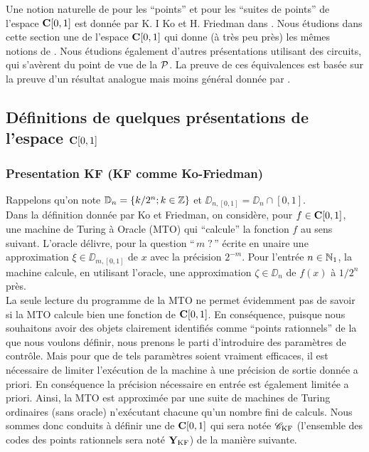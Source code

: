 Une notion naturelle de \com pour les ``points'' et pour les ``suites de points'' 
de l'espace   ${{\bf C}[0,1]}$  est donnée par  K. I Ko et H. Friedman dans \cite{fKF82}. 
Nous étudions dans cette section une \rp  de l'espace  ${{\bf C}[0,1]}$  qui donne (à très peu près) les mêmes notions de \com. Nous étudions également 
d'autres présentations utilisant des circuits, qui s'avèrent \equivas du 
point de vue de la \com  ${\cal P}$. La preuve de ces équivalences est basée sur 
la preuve d'un résultat analogue mais moins général donnée par 
\cite{fHo87,fHo90}. 

\subsection {Définitions de quelques présentations de l'espace 
 \texorpdfstring{${{\bf C}[0,1]}$}{C[0,1]}}\label{fsubsec41}
 
\subsubsection{Presentation KF (KF comme Ko-Friedman) }\label{fsubsubsec411}
Rappelons qu'on note  $\mathbb {D}_n = \{ k/2^n ; k \in \mathbb {Z} \}$  et  $\DD_{n,[0,1]} = 
\DD_n \cap [0,1]$.   \\ 
Dans la définition donnée par Ko et Friedman, on considère, pour  
$f \in {{\bf C}[0,1]}$, une machine de Turing à Oracle  (MTO)  qui ``calcule'' la 
fonction $f$ au sens suivant. 
 L'oracle délivre, pour la question  ``$\,m\;?\,$'' écrite en unaire  une approximation 
  $\xi \in\DD_{m,[0,1]}$ de $x$ avec la précision  $2^{-m}$. 
Pour l'entrée  $n \in  \mathbb {N}_1$, la machine calcule, en utilisant l'oracle, une 
approximation $ \zeta  \in  \DD_n$  de  $f(x)$  à $1/2^n$  près.\\
La seule lecture du programme de la  MTO  ne permet évidemment pas de savoir si la  MTO  calcule bien une fonction de  ${{\bf C}[0,1]}$.  En conséquence, puisque nous souhaitons avoir des objets clairement identifiés comme ``points rationnels'' de la \pres que nous voulons définir, nous prenons le parti d'introduire des paramètres de contrôle. 
Mais pour que de tels paramètres soient vraiment efficaces, il est nécessaire de limiter l'exécution de la machine à une précision de sortie donnée a priori.  
En conséquence la précision nécessaire en entrée est également 
limitée a priori. Ainsi, la  MTO  est approximée par une suite de machines 
de Turing ordinaires (sans oracle) n'exécutant chacune qu'un nombre fini de calculs.
Nous sommes donc conduits à définir une \rp  de  ${{\bf C}[0,1]}$  qui sera notée  
${{{\mathscr C}}_{\rm KF}}$ (l'ensemble des codes des points rationnels  sera noté  ${{\bf Y}_{\rm KF}}$)  de la 
manière suivante. 
 
